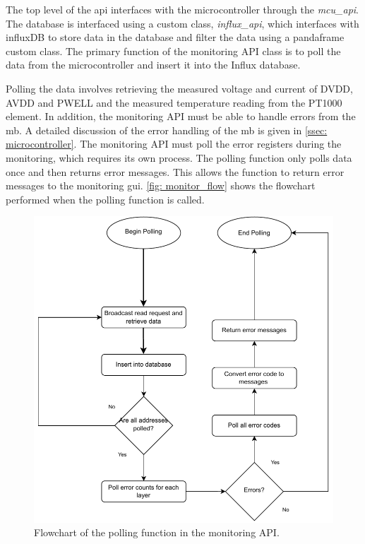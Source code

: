 \documentclass[main.tex]{subfiles}
\begin{document}
The top level of the \gls{api} interfaces with the microcontroller through the \textit{mcu\_api}. The database is interfaced using a custom class, \textit{influx\_api}, which interfaces with influxDB to store data in the database and filter the data using a pandaframe custom class. The primary function of the monitoring API class is to poll the data from the microcontroller and insert it into the Influx database. 

Polling the data involves retrieving the measured voltage and current of DVDD, AVDD and PWELL and the measured temperature reading from the PT1000 element. In addition, the monitoring API must be able to handle errors from the \gls{mb}. A detailed discussion of the error handling of the \gls{mb} is given in \autoref{ssec: microcontroller}. The monitoring API must poll the error registers during the monitoring, which requires its own process. The polling function only polls data once and then returns error messages. This allows the function to return error messages to the monitoring \gls{gui}. \autoref{fig: monitor_flow} shows the flowchart performed when the polling function is called.

\begin{figure}[!ht]
    \centering
    \includegraphics[scale=0.9]{images/Monitoring Flowchart.pdf}
    \caption{Flowchart of the polling function in the monitoring API.}
    \label{fig: monitor_flow}
\end{figure}
\FloatBarrier
\end{document}

